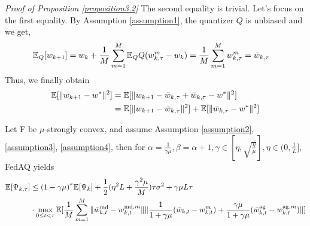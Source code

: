 \documentclass[11pt]{article}
\begin{document}
\emph{Proof of Proposition \ref{proposition3.2}} \textrm{ } The second equality is trivial. Let's focus on the first equality. By Assumption \ref{assumption1}, the quantizer $Q$ is unbiased and we get,
\begin{align*}
    \mathbb{E}_Q[w_{k+1}] &= w_k + \frac{1}{M}\sum_{m=1}^M \mathbb{E}_Q Q(w_{k, \tau}^m - w_k) = \frac{1}{M} \sum_{m=1}^M w_{k, \tau}^m = \Bar{w}_{k, \tau}
\end{align*}
Thus, we finally obtain
\begin{align*}
    \mathbb{E}[\|w_{k+1} - w^*\|^2] &= \mathbb{E}[\|w_{k+1} - \Bar{w}_{k, \tau} + \Bar{w}_{k, \tau} - w^*\|^2] \\
    &= \mathbb{E}[\|w_{k+1} - \Bar{w}_{k, \tau}\|^2] + \mathbb{E}[\|\Bar{w}_{k, \tau} - w^*\|^2]
\end{align*}

\begin{proposition} \label{proposition3.3}
Let F be $\mu$-strongly convex, and assume Assumption \ref{assumption2}, \ref{assumption3}, \ref{assumption4}, then for $\alpha=\frac{1}{\gamma\mu}, \beta=\alpha+1, \gamma \in [\eta, \sqrt{\frac{\eta}{\mu}}], \eta \in (0, \frac{1}{L}]$, FedAQ yields
\begin{align*}
    \mathbb{E}[\Psi_{k, \tau}] &\leq (1-\gamma\mu)^\tau \mathbb{E}[\Psi_k] + \frac{1}{2}(\eta^2 L + \frac{\gamma^2\mu}{M})\tau\sigma^2 + \gamma\mu L \tau \\
    &\cdot \max_{0\leq t <\tau} \mathbb{E}[\frac{1}{M} \sum_{m=1}^M \|\Bar{w}_{k, t}^{\textrm{md}} - w_{k, t}^{\textrm{md}, m}\|\|\frac{1}{1+\gamma\mu}(\Bar{w}_{k, t} - w_{k, t}^m) + \frac{\gamma\mu}{1+\gamma\mu}(\Bar{w}_{k, t}^{\textrm{ag}} - w_{k, t}^{\textrm{ag}, m})\|]
\end{align*}
\end{proposition}
\end{document}
